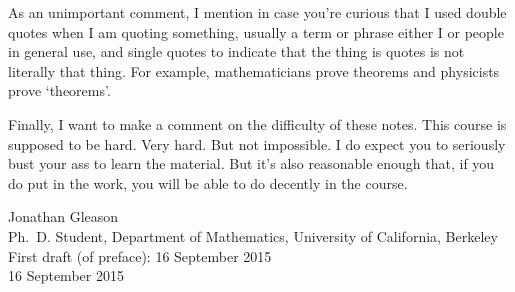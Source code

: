 As an unimportant comment, I mention in case you're curious that I used double quotes when I am quoting something, usually a term or phrase either I or people in general use, and single quotes to indicate that the thing is quotes is not literally that thing.  For example, mathematicians prove theorems and physicists prove `theorems'.

Finally, I want to make a comment on the difficulty of these notes.  This course is supposed to be hard.  Very hard.  But not impossible.  I do expect you to seriously bust your ass to learn the material.  But it's also reasonable enough that, if you do put in the work, you will be able to do decently in the course.

\blankline
\horizontalrule
\blankline

\hfill Jonathan Gleason \\
\hfill Ph.~D. Student, Department of Mathematics, University of California, Berkeley \\
\hfill First draft (of preface):  16 September 2015 \\
\hfill 16 September 2015

